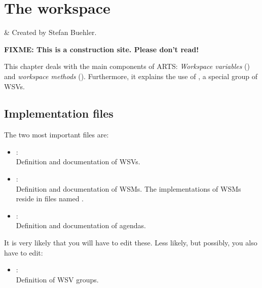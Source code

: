 
\chapter{The workspace}
\label{sec:workspace}

 & Created by Stefan Buehler.\\
\stophistory

{\Large \bf FIXME: This is a construction site. Please don't read!}

This chapter deals with the main components of ARTS: \emph{Workspace
  variables} () and
\emph{workspace methods} ().
Furthermore, it explains the use of , a special
group of WSVs.



\section{Implementation files}
\label{sec:agendas:files}

The two most important files are:
\begin{itemize}
\item {}:\\
  Definition and documentation of WSVs.
\item{}:\\
  Definition and documentation of WSMs. The
  implementations of WSMs reside in files named
  .
\item {}:\\
  Definition and documentation of agendas.
\end{itemize}
It is very likely that you will have to edit these. Less likely, but
possibly, you also have to edit:
\begin{itemize}
\item {}:\\
  Definition of WSV groups.
\end{itemize}

